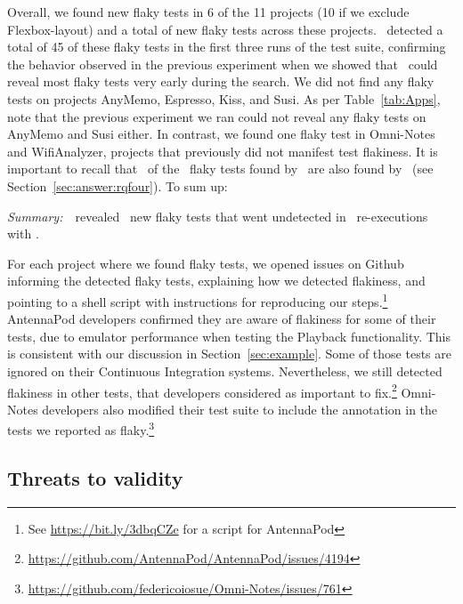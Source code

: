\documentclass[conference]{IEEEtran}
\begin{document}
Overall, we found new flaky tests in 6 of the 11 projects (10 if we exclude Flexbox-layout) and a total of \numTotalNewFlaky{} new flaky tests across these projects. \tname\ detected a total of 45 of these flaky tests in the first three runs of the test suite, confirming the behavior observed in the previous experiment when we showed that \tname\ could reveal most flaky tests very early during the search. We did not find any flaky tests on projects AnyMemo, Espresso, Kiss, and Susi. As per Table~\ref{tab:Apps}, note that the previous experiment we ran could not reveal any flaky tests on AnyMemo and Susi either. In contrast, we found one flaky test in Omni-Notes and WifiAnalyzer, projects that previously did not manifest test flakiness. It is important to recall that \percFlakyDetectedShaker\ of the \numflakytestsds\ flaky tests found by \rerun\ are also found by \tname\ (see Section~\ref{sec:answer:rqfour}). To sum up: 
\begin{center}
\begin{tcolorbox}[enhanced,width=3.4in,center upper,drop shadow southwest,sharp corners]
\emph{Summary:}~\tname\ revealed \numTotalNewFlaky\ new flaky tests that went undetected in \numRandomConfigs\ re-executions with \rerun.
\end{tcolorbox}
\end{center}

For each project where we found flaky tests, we opened issues on Github informing the detected flaky tests, explaining how we detected flakiness, and pointing to a shell script with instructions for reproducing our steps.\footnote{See \url{https://bit.ly/3dbqCZe} for a script for AntennaPod} 
AntennaPod developers confirmed they are aware of flakiness for some of their tests, due to emulator performance when testing the Playback functionality. This is consistent with our discussion in Section~\ref{sec:example}. Some of those tests are ignored on their Continuous Integration systems. Nevertheless, we still detected flakiness in other tests, that developers considered as important to fix.\footnote{\url{https://github.com/AntennaPod/AntennaPod/issues/4194}}
Omni-Notes developers also modified their test suite to include the  annotation in the tests we reported as flaky.\footnote{\url{https://github.com/federicoiosue/Omni-Notes/issues/761}}


\subsection{Threats to validity}
\end{document}
